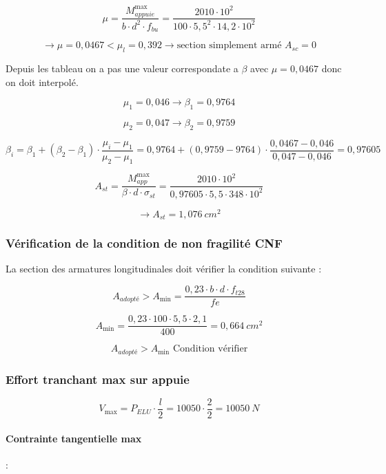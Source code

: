 \documentclass[12pt,a4paper]{article}
\begin{document}
	\[ \mu = \dfrac{M_{appuie}^{\max}}{b \cdot d^{2} \cdot f_{bu}}
	= \dfrac{2010 \cdot 10^{2}}{100 \cdot 5,5^{2} \cdot 14,2 \cdot 10^{2}} \]
	
	
	\[\rightarrow \mu  = 0,0467 < \mu_{l}  = 0,392 \rightarrow \text{section simplement armé } A_{sc} = 0 \]
	
	Depuis les tableau on a pas une valeur correspondate a $ \beta $ avec $ \mu  = 0,0467 $ donc on doit interpolé.
	
	\[ \mu_{1}  = 0,046 \rightarrow \beta_{1}  = 0,9764 \]
	
	\[ \mu_{2}  = 0,047 \rightarrow \beta_{2} = 0,9759 \]
	
	\[ \beta_{i}  = \beta_{1} + (\beta_{2} - \beta_{1}) \cdot \dfrac{\mu_{i} - \mu_{1}}{\mu_{2} - \mu_{1}}
	= 0,9764  + (0,9759 - 9764) \cdot \dfrac{0,0467 - 0,046}{0,047 - 0,046}  = 0,97605
	\]
	
	\[ A_{st}  =  \dfrac{M_{app}^{\max}}{\beta \cdot d \cdot \sigma_{st}}  = \dfrac{2010 \cdot 10^{2}}{0,97605 \cdot 5,5 \cdot 348 \cdot 10^{2}} \]
	
	\[ \rightarrow A_{st}  = 1,076 ~\unit{cm^{2}} \]
	
	\subsubsection{Vérification de la condition de non fragilité CNF}
	
	La section des armatures longitudinales doit vérifier la condition suivante : 
	
	\[ A_{adopté} > A_{\min} = \dfrac{0,23 \cdot b \cdot d \cdot f_{t28}}{fe} \]
	
	\[ A_{\min}  = \dfrac{0,23 \cdot 100 \cdot 5,5 \cdot 2,1}{400} = 0,664 ~\unit{cm^{2}} \]
	
	\[ A_{adopté} > A_{\min} \text{ Condition vérifier} \]
	
	
	
	\subsubsection{Effort tranchant max sur appuie}
	
	\[ V_{\max}  = P_{ELU} \cdot \dfrac{l}{2}  = 10050 \cdot \dfrac{2}{2} = 10050 ~\unit{N} \]
	
	\paragraph{Contrainte tangentielle max} :
	
\end{document}
